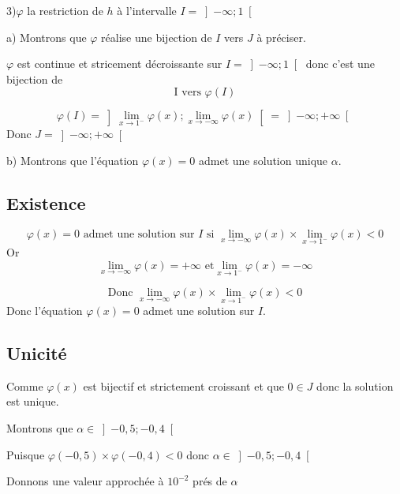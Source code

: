 \documentclass[12pt]{article}
\begin{document}

3)$\varphi$ la restriction de $h$ à l’intervalle $I=\left]-\infty; 1 \right[ $
   
    a) Montrons que $\varphi$  réalise une bijection de $I$ vers $J$  à préciser.
    
$\varphi$ est continue et stricement décroissante sur $I=\left]-\infty; 1 \right[  $ donc c'est une bijection de \[\text{I vers } \varphi(I)\]

\[\varphi(I)=\left] \lim_{x \to 1^{-}}\varphi(x); \lim_{x \to -\infty}\varphi(x) \right[=\left]-\infty; +\infty\right[\]
    Donc $J=\left]-\infty; +\infty\right[$
    
b) Montrons que l’équation $\varphi(x)=0$ admet une solution unique $\alpha$. 

\subsection*{Existence}
\[\varphi(x)=0 \text{ admet une solution sur $I$ si } \lim_{x \to -\infty}\varphi(x)\times\lim_{x \to 1^{-}}\varphi(x)<0\]
Or
\[\lim_{x \to -\infty}\varphi(x)=+\infty \text{ et} \lim_{x \to 1^{-}}\varphi(x)=-\infty\]

\[\text{Donc } \lim_{x \to -\infty}\varphi(x)\times\lim_{x \to 1^{-}}\varphi(x)<0\]
Donc l'équation $\varphi(x)=0$ admet une solution sur $I$.
\subsection*{Unicité}
Comme $\varphi(x)$ est bijectif et strictement croissant et que $0\in J$ donc la solution est unique. 

Montrons que $\alpha \in \left]-0,5 ; -0,4 \right[ $

Puisque $\varphi(-0,5)\times \varphi(-0,4)<0$ donc $\alpha \in \left]-0,5 ; -0,4 \right[ $

Donnons une valeur approchée à $10^{-2}$ prés de $\alpha$
\end{document}

